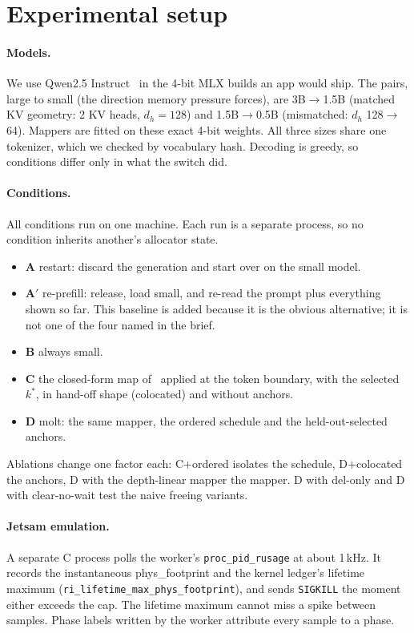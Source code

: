 \section{Experimental setup}\label{sec:setup}

\paragraph{Models.}
We use Qwen2.5 Instruct~\citep{qwen25} in the 4-bit MLX builds an app would ship.
The pairs, large to small (the direction memory pressure forces), are 3B$\to$1.5B (matched KV geometry: 2 KV heads, $d_h=128$) and 1.5B$\to$0.5B (mismatched: $d_h$ 128$\to$64).
Mappers are fitted on these exact 4-bit weights.
All three sizes share one tokenizer, which we checked by vocabulary hash.
Decoding is greedy, so conditions differ only in what the switch did.

\paragraph{Conditions.}
All conditions run on one machine.
Each run is a separate process, so no condition inherits another's allocator state.
\begin{itemize}
\item \textbf{A} restart: discard the generation and start over on the small model.
\item \textbf{A$'$} re-prefill: release, load small, and re-read the prompt plus everything shown so far. This baseline is added because it is the obvious alternative; it is not one of the four named in the brief.
\item \textbf{B} always small.
\item \textbf{C} the closed-form map of~\citep{heo2026crossmodel} applied at the token boundary, with the selected $k^*$, in hand-off shape (colocated) and without anchors.
\item \textbf{D} molt: the same mapper, the ordered schedule and the held-out-selected anchors.
\end{itemize}
Ablations change one factor each:
C$+$ordered isolates the schedule, D$+$colocated the anchors, D with the depth-linear mapper the mapper.
D with del-only and D with clear-no-wait test the naive freeing variants.

\paragraph{Jetsam emulation.}
A separate C process polls the worker's \texttt{proc\_pid\_rusage} at about 1\,kHz.
It records the instantaneous phys\_footprint and the kernel ledger's lifetime maximum (\texttt{ri\_lifetime\_max\allowbreak\_phys\_\allowbreak footprint}), and sends \texttt{SIGKILL} the moment either exceeds the cap.
The lifetime maximum cannot miss a spike between samples.
Phase labels written by the worker attribute every sample to a phase.


